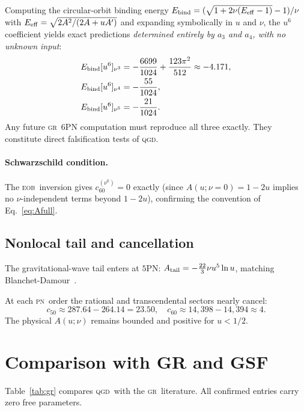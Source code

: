 \documentclass[twocolumn,aps,prd,showpacs,superscriptaddress,floatfix]{revtex4-2}
\newcommand{\pn}[1]{$#1$PN}
\newcommand{\QGD}{\textsc{qgd}}
\newcommand{\EOB}{\textsc{eob}}
\newcommand{\GR}{\textsc{gr}}
\newcommand{\PN}{\textsc{pn}}
\begin{document}
Computing the circular-orbit binding energy
$E_{\rm bind}=(\sqrt{1+2\nu(E_{\rm eff}-1)}-1)/\nu$ with
$E_{\rm eff}=\sqrt{2A^2/(2A+uA')}$ and expanding symbolically in $u$
and $\nu$, the $u^6$ coefficient yields exact predictions
\emph{determined entirely by $a_3$ and $a_4$, with no unknown input}:
\begin{align}
  E_{\rm bind}[u^6]_{\nu^3} &=
    -\frac{6699}{1024}+\frac{123\pi^2}{512}\approx-4.171,
    \label{eq:e63}\\
  E_{\rm bind}[u^6]_{\nu^4} &= -\frac{55}{1024},
    \label{eq:e64}\\
  E_{\rm bind}[u^6]_{\nu^5} &= -\frac{21}{1024}.
    \label{eq:e65}
\end{align}
Any future \GR\ \pn{6} computation must reproduce all three exactly.
They constitute direct falsification tests of \QGD.

\paragraph{Schwarzschild condition.}
The \EOB\ inversion gives $c_{60}^{(\nu^0)}=0$ exactly
(since $A(u;\nu=0)=1-2u$ implies no $\nu$-independent terms beyond
$1-2u$), confirming the convention of Eq.~\eqref{eq:Afull}.

\subsection{Nonlocal tail and cancellation}

The gravitational-wave tail enters at \pn{5}:
$A_{\rm tail}=-\tfrac{22}{3}\nu u^5\ln u$, matching
Blanchet-Damour~\cite{Blanchet:1987wq}.

At each \PN\ order the rational and transcendental sectors nearly cancel:
\begin{equation}
  c_{50}\approx287.64-264.14=23.50,\quad
  c_{60}\approx14{,}398-14{,}394\approx4.
\end{equation}
The physical $A(u;\nu)$ remains bounded and positive for $u<1/2$.

\section{Comparison with GR and GSF}
\label{sec:gr}

Table~\ref{tab:gr} compares \QGD\ with the \GR\ literature.
All confirmed entries carry zero free parameters.
\end{document}
